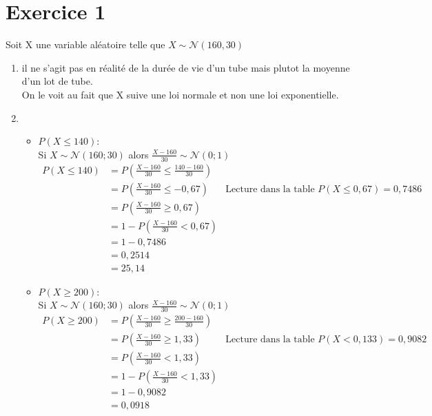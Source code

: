 \documentclass[12pt]{report}
\begin{document}
\section{Exercice 1}
Soit X une variable aléatoire telle que $X \sim \mathcal{N}(160,30)$
\begin{enumerate}
    \item il ne s'agit pas en réalité de la durée de vie d'un tube mais plutot la moyenne d'un lot de tube.\\
    On le voit au fait que X suive une loi normale et non une loi exponentielle.
    \item 
        \begin{itemize}
            \item $P(X \leq  140)$:\\
            Si $X \sim \mathcal{N}(160;30)$ alors $\frac{X-160}{30} \sim \mathcal{N}(0;1)$\\
            \begin{align*}
                P(X \leq  140) &= P(\frac{X-160}{30} \leq \frac{140-160}{30})\\
                &= P(\frac{X-160}{30} \leq -0,67)
                & \text{Lecture dans la table $P(X \leq 0,67) = 0,7486$}\\
                &= P(\frac{X-160}{30} \geq 0,67)\\
                &= 1 - P(\frac{X-160}{30} < 0,67)\\
                &= 1- 0,7486\\
                &=0,2514\\
                & = 25,14%
            \end{align*}
            \item $P(X \geq 200)$:\\
            Si $X \sim \mathcal{N}(160;30)$ alors $\frac{X-160}{30} \sim \mathcal{N}(0;1)$\\
            \begin{align*}
                P(X \geq 200 ) &= P(\frac{X-160}{30} \geq \frac{200-160}{30})\\
                &= P(\frac{X-160}{30} \geq 1,33)
                & \text{Lecture dans la table $P(X < 0,133) = 0,9082$}\\
                &= P(\frac{X-160}{30} < 1,33)\\
                &= 1 - P(\frac{X-160}{30} < 1,33)\\
                &= 1- 0,9082\\
                &=0,0918\\

\end{align*}
\end{itemize}
\end{enumerate}
\end{document}
